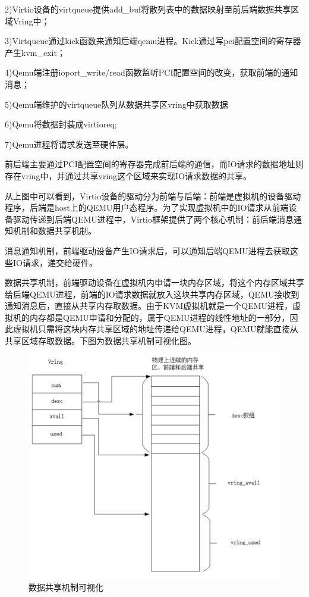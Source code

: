2)Virtio设备的virtqueue提供add_buf将散列表中的数据映射至前后端数据共享区域Vring中；

3)Virtqueue通过kick函数来通知后端qemu进程。Kick通过写pci配置空间的寄存器产生kvm_exit；

4)Qemu端注册ioport_write/read函数监听PCI配置空间的改变，获取前端的通知消息；

5)Qemu端维护的virtqueue队列从数据共享区vring中获取数据

6)Qemu将数据封装成virtioreq;

7)Qemu进程将请求发送至硬件层。

前后端主要通过PCI配置空间的寄存器完成前后端的通信，而IO请求的数据地址则存在vring中，并通过共享vring这个区域来实现IO请求数据的共享。

从上图中可以看到，Virtio设备的驱动分为前端与后端：前端是虚拟机的设备驱动程序，后端是host上的QEMU用户态程序。为了实现虚拟机中的IO请求从前端设备驱动传递到后端QEMU进程中，Virtio框架提供了两个核心机制：前后端消息通知机制和数据共享机制。

消息通知机制，前端驱动设备产生IO请求后，可以通知后端QEMU进程去获取这些IO请求，递交给硬件。

数据共享机制，前端驱动设备在虚拟机内申请一块内存区域，将这个内存区域共享给后端QEMU进程，前端的IO请求数据就放入这块共享内存区域，QEMU接收到通知消息后，直接从共享内存取数据。由于KVM虚拟机就是一个QEMU进程，虚拟机的内存都是QEMU申请和分配的，属于QEMU进程的线性地址的一部分，因此虚拟机只需将这块内存共享区域的地址传递给QEMU进程，QEMU就能直接从共享区域存取数据。下图为数据共享机制可视化图。
\begin{figure}[H]
    \centering
    \includegraphics{figures/06-03-3.png}
    \caption{数据共享机制可视化}
\end{figure}